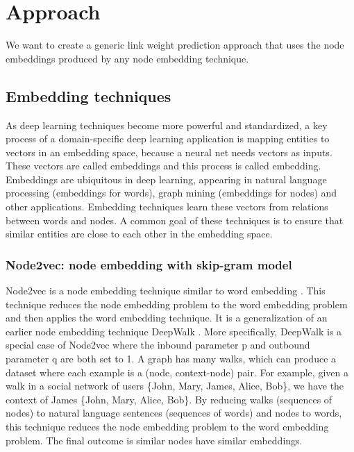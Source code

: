 \documentclass[12pt]{WSUThesis}
\theoremstyle{definition}
\begin{document}
\section{Approach}
We want to create a generic link weight prediction approach that uses the node embeddings produced by any node embedding technique.

\subsection{Embedding techniques}
As deep learning techniques become more powerful and standardized,
a key process of a domain-specific deep learning application
is mapping entities to vectors in an embedding space,
because a neural net needs vectors as inputs.
These vectors are called embeddings and this process is called embedding.
Embeddings are ubiquitous in deep learning,
appearing in natural language processing (embeddings for words),
graph mining (embeddings for nodes) and other applications.
Embedding techniques learn these vectors from relations between words and nodes.
A common goal of these techniques is to ensure that
similar entities are close to each other in the embedding space.

\subsubsection{Node2vec: node embedding with skip-gram model}
Node2vec is a node embedding technique similar to word embedding \citep{grover2016node2vec}.
This technique reduces the node embedding problem to the word embedding problem and then applies the word embedding technique.
It is a generalization of an earlier node embedding technique DeepWalk \citep{perozzi2014deepwalk}.
More specifically, DeepWalk is a special case of Node2vec where the inbound parameter p and outbound parameter q are both set to 1.
A graph has many walks, which can produce a dataset where each example is a (node, context-node) pair.
For example, given a walk in a social network of users \{John, Mary, James, Alice, Bob\}, we have the context of James \{John, Mary, Alice, Bob\}.
By reducing walks (sequences of nodes) to natural language sentences (sequences of words) and nodes to words,
this technique reduces the node embedding problem to the word embedding problem.
The final outcome is similar nodes have similar embeddings.
\end{document}
